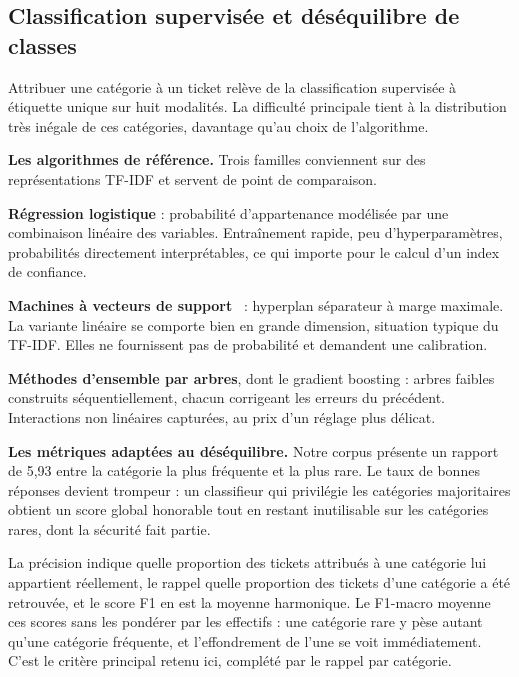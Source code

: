 \subsection{Classification supervisée et déséquilibre de classes}

Attribuer une catégorie à un ticket relève de la classification supervisée à étiquette unique sur
huit modalités. La difficulté principale tient à la distribution très inégale de ces catégories,
davantage qu'au choix de l'algorithme.

\textbf{Les algorithmes de référence.} Trois familles conviennent sur des représentations TF-IDF et servent de point de comparaison.

\begin{puces}
\item \textbf{Régression logistique} : probabilité d'appartenance modélisée par une combinaison
linéaire des variables. Entraînement rapide, peu d'hyperparamètres, probabilités directement
interprétables, ce qui importe pour le calcul d'un index de confiance.
\item \textbf{Machines à vecteurs de support}~\cite{cortes1995} : hyperplan séparateur à marge
maximale. La variante
linéaire se comporte bien en grande dimension, situation typique du TF-IDF. Elles ne fournissent pas
de probabilité et demandent une calibration.
\item \textbf{Méthodes d'ensemble par arbres}, dont le gradient boosting : arbres faibles construits
séquentiellement, chacun corrigeant les erreurs du précédent. Interactions non linéaires capturées,
au prix d'un réglage plus délicat.
\end{puces}

\textbf{Les métriques adaptées au déséquilibre.} Notre corpus présente un rapport de 5,93 entre la catégorie la plus fréquente et la plus rare. Le
taux de bonnes réponses devient trompeur : un classifieur qui privilégie les catégories majoritaires
obtient un score global honorable tout en restant inutilisable sur les catégories rares, dont la
sécurité fait partie.

La précision indique quelle proportion des tickets attribués à une catégorie lui appartient
réellement, le rappel quelle proportion des tickets d'une catégorie a été retrouvée, et le score F1
en est la moyenne harmonique. Le F1-macro moyenne ces scores sans les pondérer par les effectifs :
une catégorie rare y pèse autant qu'une catégorie fréquente, et l'effondrement de l'une se voit
immédiatement. C'est le critère principal retenu ici, complété par le rappel par catégorie.

